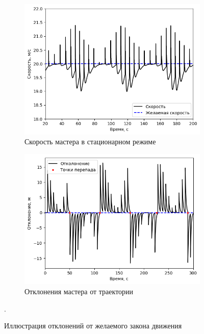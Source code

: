 \documentclass[a4paper, 14pt]{extarticle}
\begin{document}
\begin{figure}[!htbp]
	\centering
	\begin{subfigure}{.5\textwidth}
		\centering
		\includegraphics[width=1\linewidth]{master-trajectory-1-velocity.png}
		\caption{Скорость мастера в стационарном режиме}
		\label{fig:error-master-1}
	\end{subfigure}%
	\begin{subfigure}{.5\textwidth}
		\centering
		\includegraphics[width=1\linewidth]{master-trajectory-error.png}
		\caption{Отклонения мастера от траектории}
		\label{fig:error-master-2}
	\end{subfigure}
	\caption{Иллюстрация отклонений от желаемого закона движения}.
	\label{fig:errors-master}
\end{figure}
\end{document}
